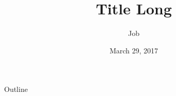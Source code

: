 \documentclass[xcolor=dvipsnames]{beamer}
\title[Title Short]{Title Long}
\author{Job}
\date{March 29, 2017}
\begin{document}
\begin{frame}
 \initclock 
  \titlepage
\end{frame}
\begin{frame}{Outline}
  \tableofcontents
\end{frame}
\end{document}
